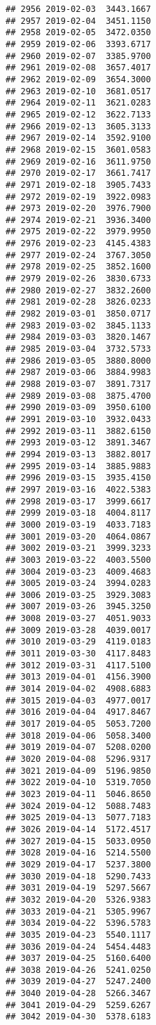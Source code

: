 \documentclass[
]{article}
\begin{document}
\begin{verbatim}
## 2956 2019-02-03  3443.1667
## 2957 2019-02-04  3451.1150
## 2958 2019-02-05  3472.0350
## 2959 2019-02-06  3393.6717
## 2960 2019-02-07  3385.9700
## 2961 2019-02-08  3657.4017
## 2962 2019-02-09  3654.3000
## 2963 2019-02-10  3681.0517
## 2964 2019-02-11  3621.0283
## 2965 2019-02-12  3622.7133
## 2966 2019-02-13  3605.3133
## 2967 2019-02-14  3592.9100
## 2968 2019-02-15  3601.0583
## 2969 2019-02-16  3611.9750
## 2970 2019-02-17  3661.7417
## 2971 2019-02-18  3905.7433
## 2972 2019-02-19  3922.0983
## 2973 2019-02-20  3976.7900
## 2974 2019-02-21  3936.3400
## 2975 2019-02-22  3979.9950
## 2976 2019-02-23  4145.4383
## 2977 2019-02-24  3767.3050
## 2978 2019-02-25  3852.1600
## 2979 2019-02-26  3830.6733
## 2980 2019-02-27  3832.2600
## 2981 2019-02-28  3826.0233
## 2982 2019-03-01  3850.0717
## 2983 2019-03-02  3845.1133
## 2984 2019-03-03  3820.1467
## 2985 2019-03-04  3732.5733
## 2986 2019-03-05  3880.8000
## 2987 2019-03-06  3884.9983
## 2988 2019-03-07  3891.7317
## 2989 2019-03-08  3875.4700
## 2990 2019-03-09  3950.6100
## 2991 2019-03-10  3932.0433
## 2992 2019-03-11  3882.6150
## 2993 2019-03-12  3891.3467
## 2994 2019-03-13  3882.8017
## 2995 2019-03-14  3885.9883
## 2996 2019-03-15  3935.4150
## 2997 2019-03-16  4022.5383
## 2998 2019-03-17  3999.6617
## 2999 2019-03-18  4004.8117
## 3000 2019-03-19  4033.7183
## 3001 2019-03-20  4064.0867
## 3002 2019-03-21  3999.3233
## 3003 2019-03-22  4003.5500
## 3004 2019-03-23  4009.4683
## 3005 2019-03-24  3994.0283
## 3006 2019-03-25  3929.3083
## 3007 2019-03-26  3945.3250
## 3008 2019-03-27  4051.9033
## 3009 2019-03-28  4039.0017
## 3010 2019-03-29  4119.0183
## 3011 2019-03-30  4117.8483
## 3012 2019-03-31  4117.5100
## 3013 2019-04-01  4156.3900
## 3014 2019-04-02  4908.6883
## 3015 2019-04-03  4977.0017
## 3016 2019-04-04  4917.8467
## 3017 2019-04-05  5053.7200
## 3018 2019-04-06  5058.3400
## 3019 2019-04-07  5208.0200
## 3020 2019-04-08  5296.9317
## 3021 2019-04-09  5196.9850
## 3022 2019-04-10  5319.7050
## 3023 2019-04-11  5046.8650
## 3024 2019-04-12  5088.7483
## 3025 2019-04-13  5077.7183
## 3026 2019-04-14  5172.4517
## 3027 2019-04-15  5033.0950
## 3028 2019-04-16  5214.5500
## 3029 2019-04-17  5237.3800
## 3030 2019-04-18  5290.7433
## 3031 2019-04-19  5297.5667
## 3032 2019-04-20  5326.9383
## 3033 2019-04-21  5305.9967
## 3034 2019-04-22  5396.5783
## 3035 2019-04-23  5540.1117
## 3036 2019-04-24  5454.4483
## 3037 2019-04-25  5160.6400
## 3038 2019-04-26  5241.0250
## 3039 2019-04-27  5247.2400
## 3040 2019-04-28  5266.3467
## 3041 2019-04-29  5259.6267
## 3042 2019-04-30  5378.6183

\end{verbatim}
\end{document}
